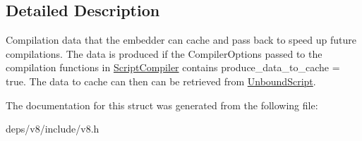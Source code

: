 \subsection{Detailed Description}
Compilation data that the embedder can cache and pass back to speed up future compilations. The data is produced if the Compiler\+Options passed to the compilation functions in \hyperlink{classv8_1_1_script_compiler}{Script\+Compiler} contains produce\+\_\+data\+\_\+to\+\_\+cache = true. The data to cache can then can be retrieved from \hyperlink{classv8_1_1_unbound_script}{Unbound\+Script}. 

The documentation for this struct was generated from the following file\+:\begin{DoxyCompactItemize}
\item 
deps/v8/include/v8.\+h\end{DoxyCompactItemize}
